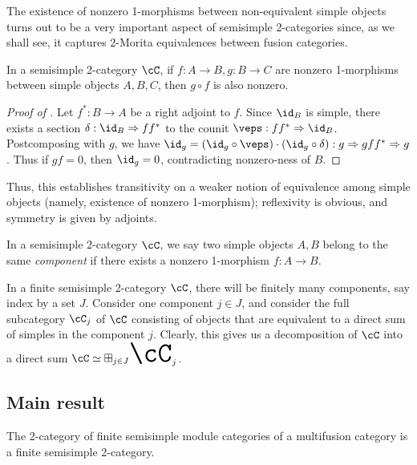 \documentclass[12pt]{article}
\newcommand{\bigboxplus}{\Huge \boxplus}%
\begin{document}
The existence of nonzero 1-morphisms
between non-equivalent simple objects
turns out to be a very important aspect of semisimple 2-categories
since, as we shall see,
it captures 2-Morita equivalences between fusion categories.

\begin{proposition}
\label{p:schur-lemma}
In a semisimple 2-category $\cC$,
if $f: A \to B, g: B \to C$ are nonzero 1-morphisms
between simple objects $A,B,C$,
then $g \circ f$ is also nonzero.
\end{proposition}

\begin{proof}[Proof of ]
Let $f^*: B \to A$ be a right adjoint to $f$.
Since $\id_B$ is simple, there exists a section
$\delta: \id_B \Rightarrow ff^*$
to the counit $\veps: ff^* \Rightarrow \id_B$.
Postcomposing with $g$,
we have $\id_g = (\id_g \circ \veps) \cdot (\id_g \circ \delta):
g \Rightarrow gff^* \Rightarrow g$.
Thus if $gf = 0$, then $\id_g = 0$,
contradicting nonzero-ness of $B$.
\end{proof}

Thus, this establishes transitivity on a weaker notion
of equivalence among simple objects
(namely, existence of nonzero 1-morphism);
reflexivity is obvious,
and symmetry is given by adjoints.

\begin{definition}
In a semisimple 2-category $\cC$,
we say two simple objects $A,B$ belong to the same
\emph{component} if there exists a nonzero 1-morphism
$f: A \to B$.
\end{definition}


In a finite semisimple 2-category $\cC$,
there will be finitely many components,
say index by a set $J$.
Consider one component $j \in J$,
and consider the full subcategory $\cC_j$ of $\cC$
consisting of objects that are equivalent
to a direct sum of simples in the component $j$.
Clearly, this gives us a decomposition of $\cC$ into a direct sum
$\cC \simeq \bigboxplus_{j \in J} \cC_j$.


\subsection{Main result}

\begin{theorem}
The 2-category of finite semisimple module categories
of a multifusion category
is a finite semisimple 2-category.
\end{theorem}
\end{document}
